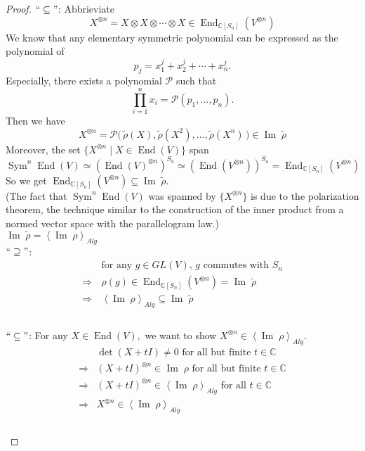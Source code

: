 \documentclass[11pt,oneside]{amsart}
\numberwithin{equation}{section}
\theoremstyle{plain}
\theoremstyle{plain}
\numberwithin{equation}{section}
\theoremstyle{remark}
\newcommand{\elli}{,\ldots,}
\newcommand{\exist}{ there exists }
\newcommand{\st}{ such that }
\newcommand{\End}{\operatorname{End}}
\newcommand{\im}{\operatorname{Im}\;}
\begin{document}
\begin{proof}
	$``\subseteq"$: Abbrieviate
	$$X^{\otimes n} = X \otimes X \otimes \cdots \otimes X \in \End_{\mathbb{C}[S_n]}(V^{\otimes n})$$
	We know that any elementary symmetric polynomial can be expressed as the polynomial of 
	$$p_j=x_1^j+x_2^j+\cdots +x_n^j.$$
	Especially, \exist a polynomial $\mathcal{P}$\st 
	$$\prod_{i=1}^{n}x_i=\mathcal{P}(p_1\elli p_n).$$
	Then we have
	$$X^{\otimes n}= \mathcal{P}\big(\,\tilde{\rho}(X),\tilde{\rho}(X^2)\elli \tilde{\rho}(X^n)\,\big) \in \im \tilde{\rho}$$
	Moreover, the set $\{X^{\otimes n}\mid X\in \End(V)\}$ span
	$$\operatorname{Sym}^{n} \End(V) \simeq\left(\End(V)^{\otimes n}\right)^{S_{n}} \simeq\left(\End\left(V^{\otimes n}\right)\right)^{S_{n}}=\End_{\mathbb{C}\left[S_{n}\right]}\left(V^{\otimes n}\right)$$
	So we get $\End_{\mathbb{C}[S_n]}(V^{\otimes n})\subseteq \im \tilde{\rho}$.\\
	
	(The fact that $\operatorname{Sym}^{n} \End(V)$ was spanned by $\{X^{\otimes n}\}$ is due to the polarization theorem, the technique similar to the construction of the inner product from a normed vector space with the parallelogram law.)\\
	
	\noindent\underline{$\im \tilde{\rho} =\left<\im \rho\right>_{Alg}$}\\
	
	$``\supseteq"$: \\[-0.8cm]
	\begin{equation*}
	\begin{aligned}
	\,& \text{for any $g \in GL(V)$, $g$ commutes with $S_n$}\\
		\Rightarrow\,& \rho(g) \in \End_{\mathbb{C}[S_n]}(V^{\otimes n}) =\im \tilde{\rho}\\
		\Rightarrow\,& \left<\im \rho\right>_{Alg} \subseteq \im \tilde{\rho}\\
	\end{aligned}
	\end{equation*}\\
	
	$``\subseteq"$: For any $X \in \End(V),$ we want to show $X^{\otimes n} \in \left<\im \rho\right>_{Alg}$.
	\begin{equation*}
	\begin{aligned}
	& \det (X+tI) \neq 0 \text{ for all but finite } t \in \mathbb{C}\\
	\Rightarrow&(X+tI)^{\otimes n} \in \im \rho \text{ for all but finite } t \in \mathbb{C}\\
	\Rightarrow&(X+tI)^{\otimes n} \in \left<\im \rho\right>_{Alg} \text{ for all } t \in \mathbb{C}\\
	\Rightarrow&X^{\otimes n} \in \left<\im \rho\right>_{Alg}\\
	\end{aligned}
	\end{equation*}\\
	

\end{proof}
\end{document}
